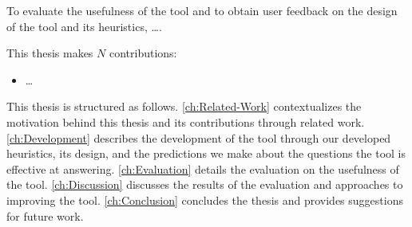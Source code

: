 To evaluate the usefulness of the tool and to obtain user feedback on the design of the tool and its heuristics, \dots {}.

This thesis makes $N$ contributions:
\begin{itemize}
	\item \dots {}
\end{itemize}

This thesis is structured as follows. 
\autoref{ch:Related-Work} contextualizes the motivation behind this thesis and its contributions through related work. 
\autoref{ch:Development} describes the development of the tool through our developed heuristics, its design, and the predictions we make about the questions the tool is effective at answering. 
\autoref{ch:Evaluation} details the evaluation on the usefulness of the tool.
\autoref{ch:Discussion} discusses the results of the evaluation and approaches to improving the tool.
\autoref{ch:Conclusion} concludes the thesis and provides suggestions for future work.

\endinput

Any text after an \endinput is ignored.
You could put scraps here or things in progress.
